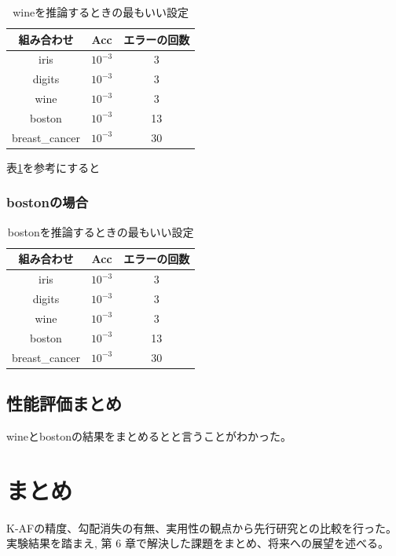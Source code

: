 \begin{table}[htbp]
    \begin{center}
        \caption{wineを推論するときの最もいい設定}
        \label{winebest}
        \vspace{2mm} 
        \begin{tabular}{ |c|c|c| }
        組み合わせ & Acc & エラーの回数 \\
        \hline
        iris           & $ 10^{-3} $    & 3 \\
        digits         & $ 10^{-3} $    & 3 \\
        wine           & $ 10^{-3} $    & 3 \\
        boston         & $ 10^{-3} $    & 13  \\
        breast\_cancer & $ 10^{-3} $    & 30 \\
        \end{tabular}
    \end{center}
\end{table}

表\ref{winebest}を参考にすると

\subsubsection{bostonの場合}

\begin{table}[htbp]
    \begin{center}
        \caption{bostonを推論するときの最もいい設定}
        \label{bostonbest}
        \vspace{2mm} 
        \begin{tabular}{ |c|c|c| }
        組み合わせ & Acc & エラーの回数 \\
        \hline
        iris           & $ 10^{-3} $    & 3 \\
        digits         & $ 10^{-3} $    & 3 \\
        wine           & $ 10^{-3} $    & 3 \\
        boston         & $ 10^{-3} $    & 13  \\
        breast\_cancer & $ 10^{-3} $    & 30 \\
        \end{tabular}
    \end{center}
\end{table}




\subsection{性能評価まとめ}
wineとbostonの結果をまとめるとと言うことがわかった。


\section{まとめ}

K-AFの精度、勾配消失の有無、実用性の観点から先行研究との比較を行った。
実験結果を踏まえ, 第 6 章で解決した課題をまとめ、将来への展望を述べる。


